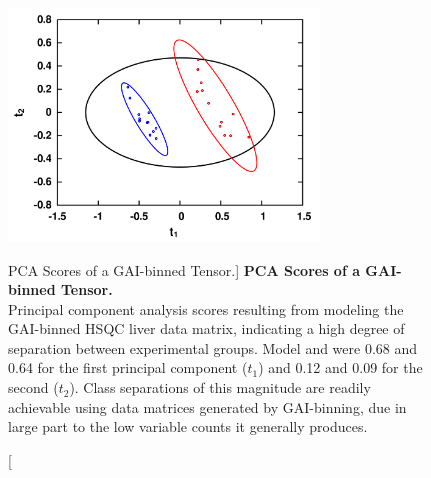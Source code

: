 \begin{figure}
\includegraphics[width=3.25in]{figs/gaibin/04-scores.png}
\caption
      [PCA Scores of a GAI-binned Tensor.]{
  {\bf PCA Scores of a GAI-binned Tensor.}
  \\
  Principal component analysis scores resulting from modeling the GAI-binned
  \hcnmr{} HSQC liver data matrix, indicating a high degree of separation
  between experimental groups. Model \rsqx{} and \qsq{} were 0.68 and 0.64 for
  the first principal component ($t_1$) and 0.12 and 0.09 for the second
  ($t_2$). Class separations of this magnitude are readily achievable using
  data matrices generated by GAI-binning, due in large part to the low variable
  counts it generally produces.
}
\label{figure.8.4}
\end{figure}

